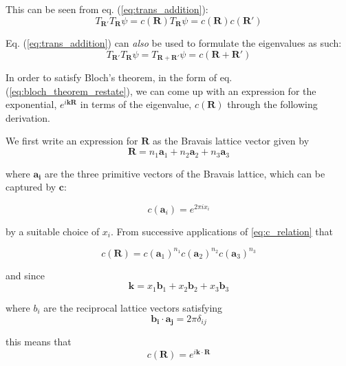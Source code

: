 This can be seen from eq. (\ref{eq:trans_addition}):
\begin{equation} \label{eq:derive_crelation1}
T_{\boldsymbol{R}'} T_{\boldsymbol{R}} \psi
= c(\boldsymbol{R}) T_{\boldsymbol{R}} \psi
= c(\boldsymbol{R}) c(\boldsymbol{R}')
\end{equation}

Eq. (\ref{eq:trans_addition}) can \emph{also} be used to formulate the eigenvalues as such:
\begin{equation}
T_{\boldsymbol{R}'} T_{\boldsymbol{R}} \psi
= T_{\boldsymbol{R} + \boldsymbol{R'}} \psi
= c(\boldsymbol{R} + \boldsymbol{R'}) 
\end{equation}

In order to satisfy Bloch's theorem, in the form of eq. (\ref{eq:bloch_theorem_restate}), we can come up with an expression for the exponential, $e^{i\boldsymbol{k} \boldsymbol{R}}$ in terms of the eigenvalue, $c(\boldsymbol{R})$ through the following derivation.

We first write an expression for $\boldsymbol{R}$ as the Bravais lattice vector given by
\begin{equation} \label{eq:r_express}
\boldsymbol{R} = n_{1} \boldsymbol{a}_{1}
+ n_{2} \boldsymbol{a}_{2}
+ n_{3} \boldsymbol{a}_{3}
\end{equation}

where $\boldsymbol{a_{i}}$ are the three primitive vectors of the Bravais lattice, which can be captured by $\boldsymbol{c}$: 

\begin{equation} \label{eq:c_exp}
c(\boldsymbol{a}_{i}) = e^{2 \pi i x_{i}}
\end{equation}

by a suitable choice  of $x_i$. From successive applications of \ref{eq:c_relation} that

\begin{equation} \label{eq:c_mult}
c(\boldsymbol{R})
= c(\boldsymbol{a}_1)^{n_1}
c(\boldsymbol{a}_2)^{n_2}
c(\boldsymbol{a}_3)^{n_3}
\end{equation}

and since
\begin{equation} \label{eq:k_with_bi}
\boldsymbol{k} = x_1 \boldsymbol{b}_1
+ x_2\boldsymbol{b}_2
+ x_3 \boldsymbol{b}_3
\end{equation}

where $b_i$ are the reciprocal lattice vectors satisfying
\begin{equation} \label{eq:recip_b}
\boldsymbol{b_i \cdot a_j}
= 2 \pi \delta_{ij}
\end{equation}

this means that
\begin{equation} \label{eq:c(R)}
c(\boldsymbol{R}) 
= e^{i \boldsymbol{k} \cdot \boldsymbol{R}}
\end{equation}




